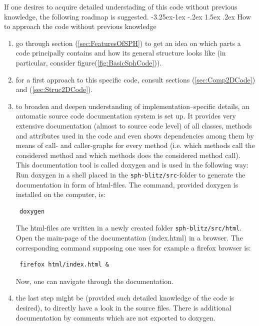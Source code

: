 \documentclass{report}
\makeatletter
\renewcommand\paragraph{\@startsection{paragraph}{4}{\z@}%
  {-3.25ex\@plus -1ex \@minus -.2ex}%
  {1.5ex \@plus .2ex}%
  {\normalfont\normalsize\bfseries}}
\makeatother
\begin{document}
If one desires to acquire detailed understading of this code without previous knowledge, the following roadmap is suggested.
\paragraph{How to approach the code without previous knowledge}
\begin{enumerate}
 \item go through section (\ref{sec:FeaturesOfSPH}) to get an idea on which parts a code principally contains and how its general structure looks like (in particular, consider figure(\ref{fig:BasicSphCode})).
\item for a first approach to this specific code, consult sections (\ref{sec:Comp2DCode}) and (\ref{sec:Struc2DCode}).
\item to broaden and deepen understanding of implementation--specific details,
an automatic source code documentation system is set up. It provides very extensive documentation (almost to source code level) of all classes, methods and attributes used in the code and even shows dependencies among them by means of call- and caller-graphs for every method (i.e. which methods call the considered method and which methods does the considered method call).
This documentation tool is called doxygen and is used in the following way:
Run doxygen in a shell placed in the {\tt sph-blitz/src}-folder to generate the documentation in form of html-files. The command, provided doxygen is installed on the computer, is:
\begin{verbatim} doxygen
\end{verbatim}
The html-files are written in a newly created folder {\tt sph-blitz/src/html}. Open the main-page of the documentation (index.html) in a browser. The corresponding command supposing one uses for example a firefox browser is:
\begin{verbatim} firefox html/index.html &
\end{verbatim}
Now, one can navigate through the documentation.
\item the last step might be (provided such detailed knowledge of the code is desired), to directly have a look in the source files. There is additional documentation by comments which are not exported to doxygen.
\end{enumerate}
\end{document}
